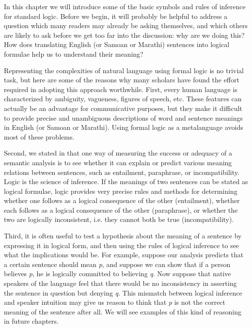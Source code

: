 In this chapter we will introduce some of the basic symbols and rules of inference for standard logic. Before we begin, it will probably be helpful to address a question which many readers may already be asking themselves, and which others are likely to ask before we get too far into the discussion: why are we doing this? How does translating English (or Samoan or Marathi) sentences into logical formulae help us to understand their meaning?



Representing the complexities of natural language using formal logic is no trivial task, but here are some of the reasons why many scholars have found the effort required in adopting this approach worthwhile. First, every human language is characterized by ambiguity, vagueness, figures of speech, etc. These features can actually be an advantage for communicative purposes, but they make it difficult to provide precise and unambiguous descriptions of word and sentence meanings in English (or Samoan or Marathi). Using formal logic as a metalanguage avoids most of these problems.



Second, we stated in  that one way of measuring the success or adequacy of a semantic analysis is to see whether it can explain or predict various meaning relations between sentences, such as entailment, paraphrase, or incompatibility. Logic is the science of inference. If the meanings of two sentences can be stated as logical formulae, logic provides very precise rules and methods for determining whether one follows as a logical consequence of the other (entailment), whether each follows as a logical consequence of the other (paraphrase), or whether the two are logically inconsistent, i.e. they cannot both be true (incompatibility).



Third, it is often useful to test a hypothesis about the meaning of a sentence by expressing it in logical form, and then using the rules of logical inference to see what the implications would be. For example, suppose our analysis predicts that a certain sentence should mean \textit{p}, and suppose we can show that if a person believes \textit{p}, he is logically committed to believing \textit{q}. Now suppose that native speakers of the language feel that there would be no inconsistency in asserting the sentence in question but denying \textit{q}. This mismatch between logical inference and speaker intuition may give us reason to think that \textit{p} is not the correct meaning of the sentence after all. We will see examples of this kind of reasoning in future chapters.



